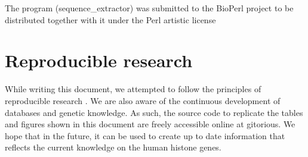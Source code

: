 \documentclass[10pt,a4paper,draft]{article}
\begin{document}
    The program (sequence\_extractor) was submitted to the BioPerl project to be distributed together with it under the Perl artistic license

  \section{Reproducible research}
    While writing this document, we attempted to follow the principles of reproducible research \cite{reproducible-research-bioinformatics, reproducible-research-law}.
    We are also aware of the continuous development of databases and genetic knowledge. As such,
    the source code to replicate the tables and figures shown in this document are freely accessible
    online at gitorious. We hope that in the future, it can be used to create up to date information
    that reflects the current knowledge on the human histone genes.
\end{document}
